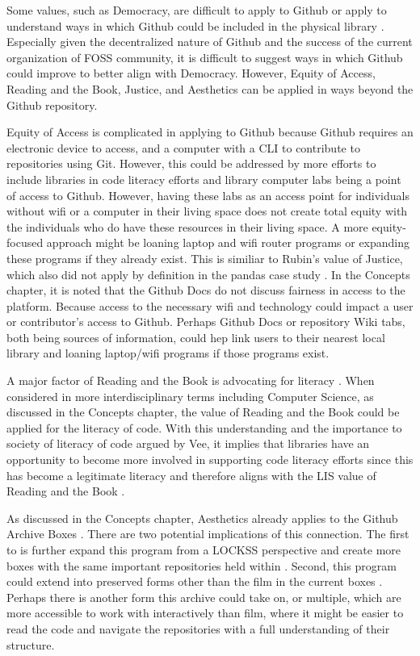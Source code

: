Some values, such as Democracy, are difficult to apply to Github or apply to understand ways in which Github could be included in the physical library \cite{gorman2000values}. Especially given the decentralized nature of Github and the success of the current organization of FOSS community, it is difficult to suggest ways in which Github could improve to better align with Democracy. However, Equity of Access, Reading and the Book, Justice, and Aesthetics can be applied in ways beyond the Github repository. 

Equity of Access is complicated in applying to Github because Github requires an electronic device to access, and a computer with a CLI to contribute to repositories using Git\cite{gorman2000values}. However, this could be addressed by more efforts to include libraries in code literacy efforts and library computer labs being a point of access to Github. However, having these labs as an access point for individuals without wifi or a computer in their living space does not create total equity with the individuals who do have these resources in their living space. A more equity-focused approach might be loaning laptop and wifi router programs or expanding these programs if they already exist. This is similiar to Rubin's value of Justice, which also did not apply by definition in the pandas case study \cite{rubin2016foundationslis}. In the Concepts chapter, it is noted that the Github Docs do not discuss fairness in access to the platform. Because access to the necessary wifi and technology could impact a user or contributor's access to Github. Perhaps Github Docs or repository Wiki tabs, both being sources of information, could hep link users to their nearest local library and loaning laptop/wifi programs if those programs exist. 

A major factor of Reading and the Book is advocating for literacy \cite{rubin2016foundationslis}. When considered in more interdisciplinary terms including Computer Science, as discussed in the Concepts chapter, the value of Reading and the Book could be applied for the literacy of code. With this understanding and the importance to society of literacy of code argued by Vee, it implies that libraries have an opportunity to become more involved in supporting code literacy efforts since this has become a legitimate literacy and therefore aligns with the LIS value of Reading and the Book \cite{vee2017coding} \cite{rubin2016foundationslis}. 

As discussed in the Concepts chapter, Aesthetics already applies to the Github Archive Boxes \cite{githubarchiveboxes}. There are two potential implications of this connection. The first to is further expand this program from a LOCKSS perspective and create more boxes with the same important repositories held within \cite{githubarchiveboxes}. Second, this program could extend into preserved forms other than the film in the current boxes \cite{githubarchiveboxes}. Perhaps there is another form this archive could take on, or multiple, which are more accessible to work with interactively than film, where it might be easier to read the code and navigate the repositories with a full understanding of their structure. 

